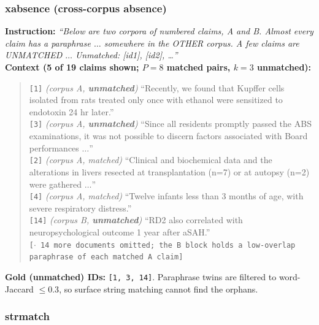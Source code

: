 \subsubsection{xabsence (cross-corpus absence)}

\textbf{Instruction:} \emph{``Below are two corpora of numbered claims, A and B. Almost every claim
has a paraphrase $\dots$ somewhere in the OTHER corpus. A few claims are UNMATCHED $\dots$ Unmatched:
[id1], [id2], \dots''}\\
\textbf{Context (5 of 19 claims shown; $P{=}8$ matched pairs, $k{=}3$ unmatched):}
\begin{quote}\small
\texttt{[1]} \emph{(corpus A, \textbf{unmatched})} ``Recently, we found that Kupffer cells isolated
from rats treated only once with ethanol were sensitized to endotoxin 24 hr later.''\\
\texttt{[3]} \emph{(corpus A, \textbf{unmatched})} ``Since all residents promptly passed the ABS
examinations, it was not possible to discern factors associated with Board performances $\dots$''\\
\texttt{[2]} \emph{(corpus A, matched)} ``Clinical and biochemical data and the alterations in livers
resected at transplantation (n=7) or at autopsy (n=2) were gathered $\dots$''\\
\texttt{[4]} \emph{(corpus A, matched)} ``Twelve infants less than 3 months of age, with severe
respiratory distress.''\\
\texttt{[14]} \emph{(corpus B, \textbf{unmatched})} ``RD2 also correlated with neuropsychological
outcome 1 year after aSAH.''\\
\texttt{[$\cdot$ 14 more documents omitted; the B block holds a low-overlap paraphrase of each
matched A claim]}
\end{quote}
\textbf{Gold (unmatched) IDs:} \texttt{[1, 3, 14]}. Paraphrase twins are filtered to word-Jaccard
$\leq 0.3$, so surface string matching cannot find the orphans.

\subsubsection{strmatch}

